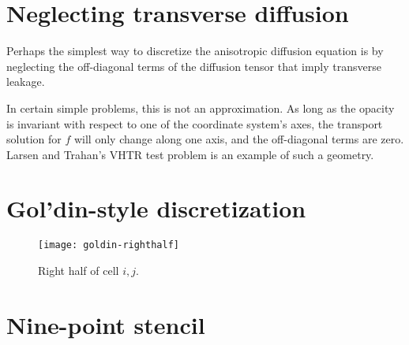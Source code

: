 \section{Neglecting transverse diffusion}

Perhaps the simplest way to discretize the anisotropic diffusion equation is by
neglecting the off-diagonal terms of the diffusion tensor that imply transverse
leakage.

In certain simple problems, this is not an approximation. As long as the
opacity is invariant with respect to one of the coordinate system's axes, the
transport solution for $f$ will only change along one axis, and the
off-diagonal terms are zero. Larsen and Trahan's VHTR test problem
\cite{Lar2009c} is an example of such a geometry.


\section{Gol'din-style discretization}

\cite{Val2002}

\begin{figure}[htb]
  \centering
  \texttt{[image: goldin-righthalf]}
  \caption{Right half of cell $i,j$.}
  \label{fig:goldinRight}
\end{figure}

\section{Nine-point stencil}

